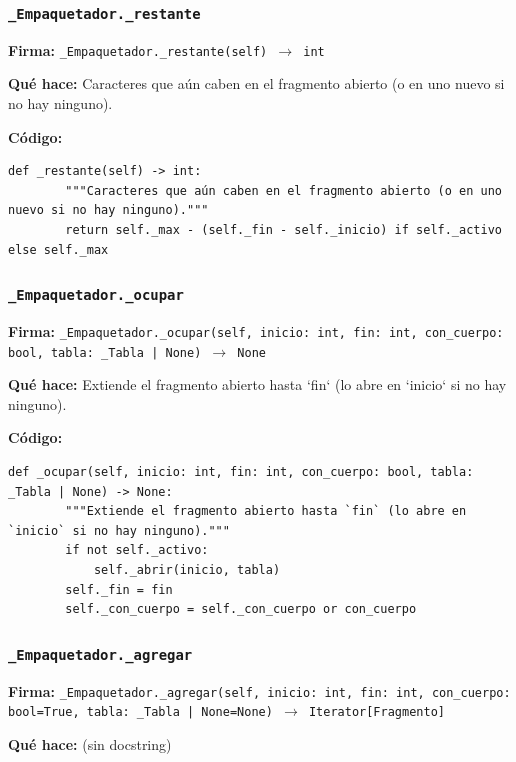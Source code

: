 \documentclass[11pt,a4paper]{article}
\begin{document}
\subsubsection*{\texttt{\_Empaquetador.\_restante}}
\textbf{Firma:} \texttt{\_Empaquetador.\_restante(self) $\rightarrow$ int}

\textbf{Qué hace:} Caracteres que aún caben en el fragmento abierto (o en uno nuevo si no hay ninguno).

\textbf{Código:}
\begin{lstlisting}
def _restante(self) -> int:
        """Caracteres que aún caben en el fragmento abierto (o en uno nuevo si no hay ninguno)."""
        return self._max - (self._fin - self._inicio) if self._activo else self._max
\end{lstlisting}

\subsubsection*{\texttt{\_Empaquetador.\_ocupar}}
\textbf{Firma:} \texttt{\_Empaquetador.\_ocupar(self, inicio: int, fin: int, con\_cuerpo: bool, tabla: \_Tabla | None) $\rightarrow$ None}

\textbf{Qué hace:} Extiende el fragmento abierto hasta `fin` (lo abre en `inicio` si no hay ninguno).

\textbf{Código:}
\begin{lstlisting}
def _ocupar(self, inicio: int, fin: int, con_cuerpo: bool, tabla: _Tabla | None) -> None:
        """Extiende el fragmento abierto hasta `fin` (lo abre en `inicio` si no hay ninguno)."""
        if not self._activo:
            self._abrir(inicio, tabla)
        self._fin = fin
        self._con_cuerpo = self._con_cuerpo or con_cuerpo
\end{lstlisting}

\subsubsection*{\texttt{\_Empaquetador.\_agregar}}
\textbf{Firma:} \texttt{\_Empaquetador.\_agregar(self, inicio: int, fin: int, con\_cuerpo: bool=True, tabla: \_Tabla | None=None) $\rightarrow$ Iterator[Fragmento]}

\textbf{Qué hace:} (sin docstring)
\end{document}
